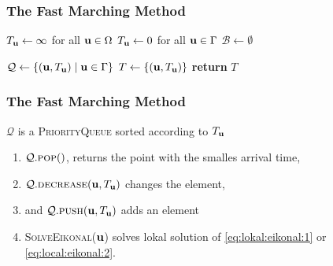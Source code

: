 \documentclass[aspectratio=169,handout]{beamer}
\begin{document}
\begin{frame}[fragile]
	\frametitle{The Fast Marching Method}
	\begin{algorithm}[H]
		
		$T_{\mathbf{u}} \leftarrow \infty$ for all $\mathbf{u} \in \Omega$\;
		$T_{\mathbf{u}}  \leftarrow 0$ for all $\mathbf{u} \in \Gamma$\;
		$\mathcal{B} \leftarrow \emptyset$ 
		
		$\mathcal{Q} \leftarrow \left\{ (\mathbf{u}, T_{\mathbf{u}}) \mid \mathbf{u} \in \Gamma \right\}$ 
		$T \leftarrow \left\{ (\mathbf{u}, T_{\mathbf{u}}) \right\}$\;
		\textbf{return} $T$\;
	\end{algorithm}
\end{frame}

\begin{frame}
	\frametitle{The Fast Marching Method}
	$\mathcal{Q}$ is a \textsc{PriorityQueue} sorted according to {\color{myblue}$T_{\mathbf{u}}$}
	\begin{enumerate}[label=$\bullet$]
		\item $\mathcal{Q}.\textsc{pop}()$, returns the point with the smalles arrival time,
		\item $\mathcal{Q}.\textsc{decrease}(\mathbf{u}, T_{\mathbf{u}})$ changes the element, 
		\item and $\mathcal{Q}.\textsc{push}(\mathbf{u}, T_{\mathbf{u}})$ adds an element
		\item \textsc{SolveEikonal}($\mathbf{u}$) solves lokal solution of \cref{eq:lokal:eikonal:1} or \cref{eq:local:eikonal:2}.
	\end{enumerate}
	\vspace{0.5cm}
\end{frame}
\end{document}
